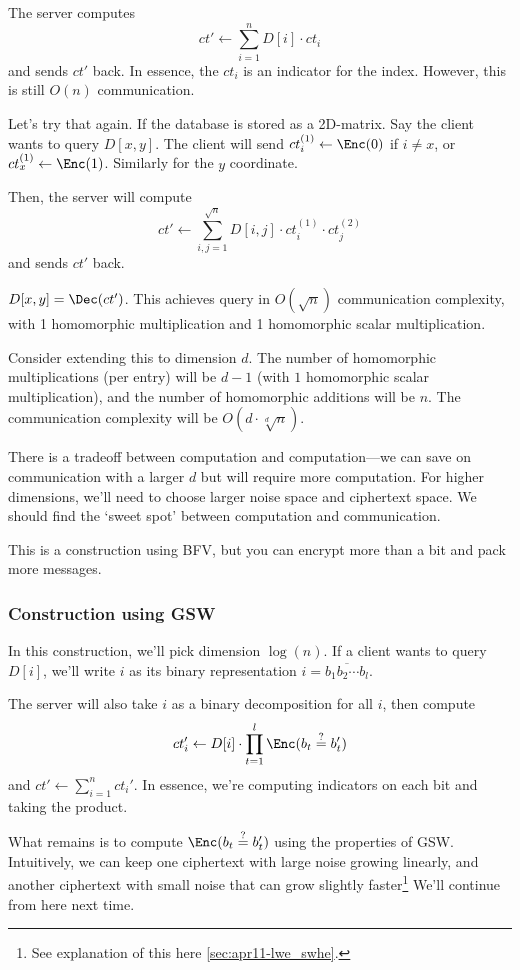The server computes
\[ct'\leftarrow \sum^n_{i=1}D[i]\cdot ct_i\]
and sends $ct'$ back. In essence, the $ct_i$ is an indicator for the index. However, this is still $O(n)$ communication.


Let's try that again. If the database is stored as a 2D-matrix. Say the client wants to query $D[x,y]$. The client will send $ct_i^{(1)}\leftarrow \Enc(0)$ if $i\neq x$, or $ct_x^{(1)}\leftarrow \Enc(1)$. Similarly for the $y$ coordinate.

Then, the server will compute
\[ct'\leftarrow \sum^{\sqrt{n}}_{i,j=1}D[i,j]\cdot ct_i^{(1)}\cdot ct_j^{(2)}\]
and sends $ct'$ back.

$D[x,y] = \Dec(ct')$. This achieves query in $O(\sqrt{n})$ communication complexity, with 1 homomorphic multiplication and 1 homomorphic scalar multiplication.


Consider extending this to dimension $d$. The number of homomorphic multiplications (per entry) will be $d-1$ (with $1$ homomorphic scalar multiplication), and the number of homomorphic additions will be $n$. The communication complexity will be $O(d\cdot \sqrt[d]{n})$.

There is a tradeoff between computation and computation---we can save on communication with a larger $d$ but will require more computation. For higher dimensions, we'll need to choose larger noise space and ciphertext space. We should find the `sweet spot' between computation and communication.

This is a construction using BFV, but you can encrypt more than a bit and pack more messages.

\subsubsection{Construction using GSW}
In this construction, we'll pick dimension $\log(n)$. If a client wants to query $D[i]$, we'll write $i$ as its binary representation $i = \overline{b_1b_2\cdots b_l}$.

The server will also take $i$ as a binary decomposition for all $i$, then compute
\[ct'_i \leftarrow D[i]\cdot \prod^l_{t=1}\Enc(b_t\overset{?}{=} b_t')\]
and $ct' \leftarrow \sum^n_{i=1}ct_i'$. In essence, we're computing indicators on each bit and taking the product.

What remains is to compute $\Enc(b_t\overset{?}{=}b_t')$ using the properties of GSW. Intuitively, we can keep one ciphertext with large noise growing linearly, and another ciphertext with small noise that can grow slightly faster\footnote{See explanation of this here \cref{sec:apr11-lwe_swhe}.} We'll continue from here next time.